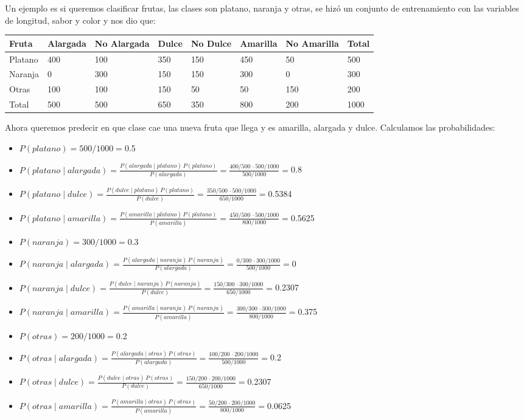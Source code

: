 \documentclass{article}
\begin{document}
 Un ejemplo es si queremos clasificar frutas, las clases son platano, naranja y otras, se hizó un conjunto de entrenamiento con las variables
 de longitud, sabor y color y nos dio que:
 \begin{center}
  \begin{tabular}{|l||l|l||l|l||l|l||l|}
   \hline
   Fruta & Alargada & No Alargada & Dulce & No Dulce & Amarilla & No Amarilla & Total \\ \hline \hline
   Platano & 400 & 100 & 350 & 150 & 450 & 50 & 500 \\ \hline
   Naranja & 0 & 300 & 150 & 150 & 300 & 0 & 300 \\ \hline
   Otras & 100 & 100 & 150 & 50 & 50 & 150 & 200 \\ \hline \hline
   Total & 500 & 500 & 650 & 350 & 800 & 200 & 1000 \\ \hline
  \end{tabular}
  \end{center}
  Ahora queremos predecir en que clase cae una nueva fruta que llega y es amarilla, alargada y dulce.
  Calculamos las probabilidades:
  \begin{itemize}
   \item $ P(platano) = 500/1000 = $0.5
   \item $ P(platano \mid alargada) = \frac{P(alargada \mid platano) \, P(platano)}{P(alargada)} = \frac{400/500 \, \cdot 500/1000}{500/1000} = $0.8
   \item $ P(platano \mid dulce) = \frac{P(dulce \mid platano) \, P(platano)}{P(dulce)} = \frac{350/500 \, \cdot 500/1000}{650/1000} = $0.5384
   \item $ P(platano \mid amarilla) = \frac{P(amarilla \mid platano) \, P(platano)}{P(amarilla)} = \frac{450/500 \, \cdot 500/1000}{800/1000} = $0.5625
   \item $ P(naranja) = 300/1000 = $0.3
   \item $ P(naranja \mid alargada) = \frac{P(alargada \mid naranja) \, P(naranja)}{P(alargada)} = \frac{0/300 \, \cdot 300/1000}{500/1000} = $0
   \item $ P(naranja \mid dulce) = \frac{P(dulce \mid naranja) \, P(naranja)}{P(dulce)} = \frac{150/300 \, \cdot 300/1000}{650/1000} = $0.2307
   \item $ P(naranja \mid amarilla) = \frac{P(amarilla \mid naranja) \, P(naranja)}{P(amarilla)} = \frac{300/300 \, \cdot 300/1000}{800/1000} = $0.375
   \item $ P(otras) = 200/1000 = $0.2
   \item $ P(otras \mid alargada) = \frac{P(alargada \mid otras) \, P(otras)}{P(alargada)} = \frac{100/200 \, \cdot 200/1000}{500/1000} = $0.2
   \item $ P(otras \mid dulce) = \frac{P(dulce \mid otras) \, P(otras)}{P(dulce)} = \frac{150/200 \, \cdot 200/1000}{650/1000} = $0.2307
   \item $ P(otras \mid amarilla) = \frac{P(amarilla \mid otras) \, P(otras)}{P(amarilla)} = \frac{50/200 \, \cdot 200/1000}{800/1000} = $0.0625
  \end{itemize}
\end{document}
